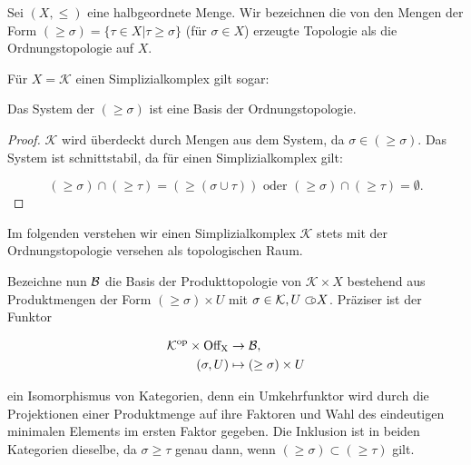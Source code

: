 
\begin{defn}
  Sei $(X, \leq)$ eine halbgeordnete Menge.  Wir bezeichnen die von
  den Mengen der Form $(\geq \sigma) = \{\tau \in X | \tau \geq
  \sigma\}$ (für $\sigma \in X$) erzeugte Topologie als die
  Ordnungstopologie auf $X$.
\end{defn}

Für $X = \mathcal{K}$ einen Simplizialkomplex gilt sogar:

\begin{lemma}
  Das System der $(\geq \sigma)$ ist eine Basis der
  Ordnungstopologie.
\end{lemma}

\begin{proof}
  $\mathcal{K}$ wird überdeckt durch Mengen aus dem System, da $\sigma
  \in (\geq \sigma)$. Das System ist schnittstabil, da für einen
  Simplizialkomplex gilt:

  \[(\geq \sigma) \cap (\geq \tau) = (\geq (\sigma \cup \tau))
  \text{ oder }
  (\geq \sigma) \cap (\geq \tau) = \emptyset. \]
\end{proof}

Im folgenden verstehen wir einen Simplizialkomplex $\mathcal{K}$ stets
mit der Ordnungstopologie versehen als topologischen Raum.

Bezeichne nun $\mathcal{B}$ die Basis der Produkttopologie von
$\mathcal{K} \times X$ bestehend aus Produktmengen der Form $(\geq
\sigma) \times U$ mit $\sigma \in \mathcal{K}, U \subset\kern-0.58em\circ X$. Präziser
ist der Funktor
  
\begin{align*}
  \mathcal{K}^\mathrm{op} \times \operatorname{Off_X} &\to \mathcal{B}, \\
  (\sigma, U) &\mapsto (\geq \sigma) \times U
\end{align*}

ein Isomorphismus von Kategorien, denn ein Umkehrfunktor wird durch
die Projektionen einer Produktmenge auf ihre Faktoren und Wahl des
eindeutigen minimalen Elements im ersten Faktor gegeben. Die Inklusion
ist in beiden Kategorien dieselbe, da $\sigma \geq \tau$ genau dann,
wenn $(\geq \sigma) \subset (\geq \tau)$ gilt.


